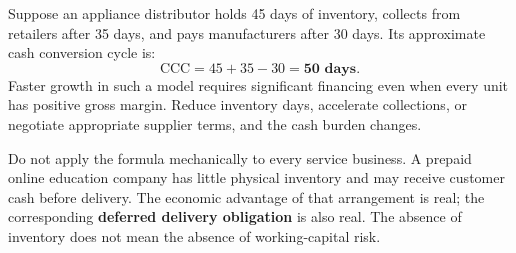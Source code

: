 Suppose an appliance distributor holds 45 days of inventory, collects from retailers after 35 days, and pays manufacturers after 30 days. Its approximate cash conversion cycle is:
\begin{equation}
\text{CCC} = 45 + 35 - 30 = \mathbf{50\text{ days}}.
\end{equation}
Faster growth in such a model requires significant financing even when every unit has positive gross margin. Reduce inventory days, accelerate collections, or negotiate appropriate supplier terms, and the cash burden changes.

Do not apply the formula mechanically to every service business. A prepaid online education company has little physical inventory and may receive customer cash before delivery. The economic advantage of that arrangement is real; the corresponding \textbf{deferred delivery obligation} is also real. The absence of inventory does not mean the absence of working-capital risk.

